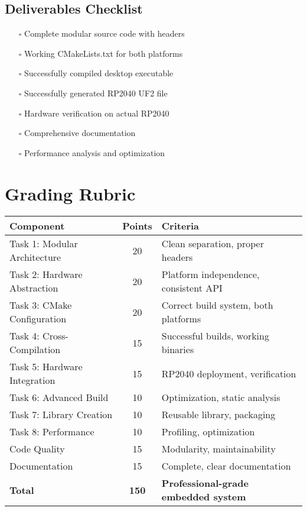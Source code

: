 \documentclass[11pt,a4paper]{article}
\begin{document}
\subsection{Deliverables Checklist}
\begin{itemize}
    \item[$\square$] Complete modular source code with headers
    \item[$\square$] Working CMakeLists.txt for both platforms
    \item[$\square$] Successfully compiled desktop executable
    \item[$\square$] Successfully generated RP2040 UF2 file
    \item[$\square$] Hardware verification on actual RP2040
    \item[$\square$] Comprehensive documentation
    \item[$\square$] Performance analysis and optimization
\end{itemize}

\section{Grading Rubric}

\begin{center}
\begin{tabular}{|l|c|l|}
\hline
\textbf{Component} & \textbf{Points} & \textbf{Criteria} \\
\hline
Task 1: Modular Architecture & 20 & Clean separation, proper headers \\
Task 2: Hardware Abstraction & 20 & Platform independence, consistent API \\
Task 3: CMake Configuration & 20 & Correct build system, both platforms \\
Task 4: Cross-Compilation & 15 & Successful builds, working binaries \\
Task 5: Hardware Integration & 15 & RP2040 deployment, verification \\
Task 6: Advanced Build & 10 & Optimization, static analysis \\
Task 7: Library Creation & 10 & Reusable library, packaging \\
Task 8: Performance & 10 & Profiling, optimization \\
Code Quality & 15 & Modularity, maintainability \\
Documentation & 15 & Complete, clear documentation \\
\hline
\textbf{Total} & \textbf{150} & \textbf{Professional-grade embedded system} \\
\hline
\end{tabular}
\end{center}
\end{document}
